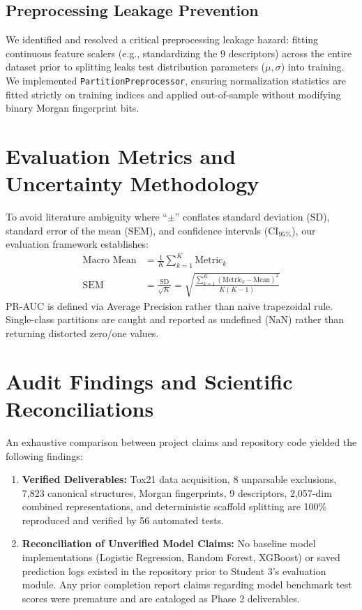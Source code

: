 \documentclass[conference]{IEEEtran}
\begin{document}
\subsection{Preprocessing Leakage Prevention}
We identified and resolved a critical preprocessing leakage hazard: fitting continuous feature scalers (e.g., standardizing the 9 descriptors) across the entire dataset prior to splitting leaks test distribution parameters ($\mu, \sigma$) into training.
We implemented \texttt{PartitionPreprocessor}, ensuring normalization statistics are fitted strictly on training indices and applied out-of-sample without modifying binary Morgan fingerprint bits.

\section{Evaluation Metrics and Uncertainty Methodology}
To avoid literature ambiguity where ``$\pm$'' conflates standard deviation ($\text{SD}$), standard error of the mean ($\text{SEM}$), and confidence intervals ($\text{CI}_{95\%}$), our evaluation framework establishes:
\begin{align}
\text{Macro Mean} &= \frac{1}{K} \sum_{k=1}^K \text{Metric}_k \\
\text{SEM} &= \frac{\text{SD}}{\sqrt{K}} = \sqrt{\frac{\sum_{k=1}^K (\text{Metric}_k - \text{Mean})^2}{K(K-1)}}
\end{align}
PR-AUC is defined via Average Precision rather than naive trapezoidal rule. Single-class partitions are caught and reported as undefined ($\text{NaN}$) rather than returning distorted zero/one values.

\section{Audit Findings and Scientific Reconciliations}
An exhaustive comparison between project claims and repository code yielded the following findings:
\begin{enumerate}
    \item \textbf{Verified Deliverables:} Tox21 data acquisition, 8 unparsable exclusions, 7,823 canonical structures, Morgan fingerprints, 9 descriptors, 2,057-dim combined representations, and deterministic scaffold splitting are 100\% reproduced and verified by 56 automated tests.
    \item \textbf{Reconciliation of Unverified Model Claims:} No baseline model implementations (Logistic Regression, Random Forest, XGBoost) or saved prediction logs existed in the repository prior to Student 3's evaluation module. Any prior completion report claims regarding model benchmark test scores were premature and are cataloged as Phase 2 deliverables.
\end{enumerate}
\end{document}

